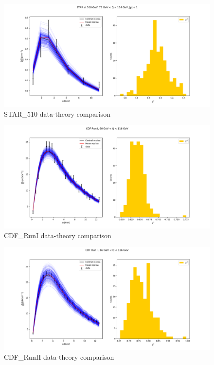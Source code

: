 \documentclass[
]{article}
\begin{document}
\begin{figure}
\centering
\includegraphics{pngplots/STAR_510.png}
\caption{STAR\_510 data-theory comparison}
\end{figure}

\begin{figure}
\centering
\includegraphics{pngplots/CDF_RunI.png}
\caption{CDF\_RunI data-theory comparison}
\end{figure}

\begin{figure}
\centering
\includegraphics{pngplots/CDF_RunII.png}
\caption{CDF\_RunII data-theory comparison}
\end{figure}
\end{document}
